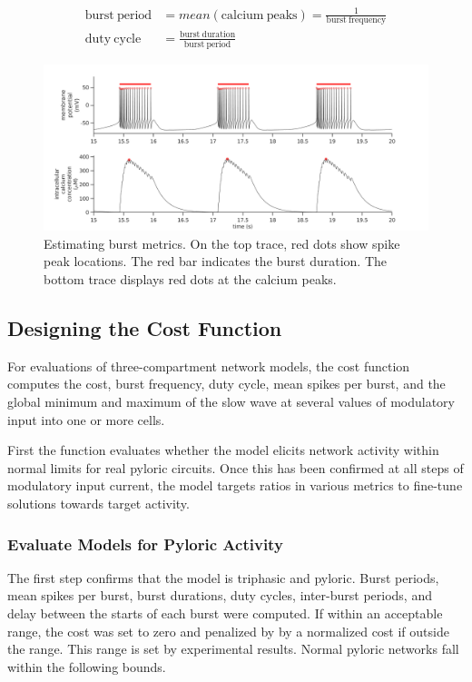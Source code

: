 \begin{align}
	\mathrm{burst~period} &= mean(\mathrm{calcium~peaks}) = \frac{1}{\mathrm{burst~frequency}} \\
	\mathrm{duty~cycle} &= \frac{\mathrm{burst~duration}}{\mathrm{burst~period}}
\end{align}

\begin{figure}[h]
	\centering
	\includegraphics[width=1.0\linewidth]{gfx/BurstMetrics}
	\caption[Estimating burst metrics]{Estimating burst metrics. On the top trace, red dots show spike peak locations. The red bar indicates the burst duration. The bottom trace displays red dots at the calcium peaks.}
	\label{fig:burstmetrics}
\end{figure}

\subsection{Designing the Cost Function} \label{sec:cost}
For evaluations of three-compartment network models, the cost function computes the cost, burst frequency, duty cycle, mean spikes per burst, and the global minimum and maximum of the slow wave at several values of modulatory input into one or more cells. 

First the function evaluates whether the model elicits network activity within normal limits for real pyloric circuits. Once this has been confirmed at all steps of modulatory input current, the model targets ratios in various metrics to fine-tune solutions towards target activity.

\subsubsection{Evaluate Models for Pyloric Activity}
The first step confirms that the model is triphasic and pyloric. Burst periods, mean spikes per burst, burst durations, duty cycles, inter-burst periods, and delay between the starts of each burst were computed. If within an acceptable range, the cost was set to zero and penalized by by a normalized cost if outside the range. This range is set by experimental results. Normal pyloric networks fall within the following bounds.

